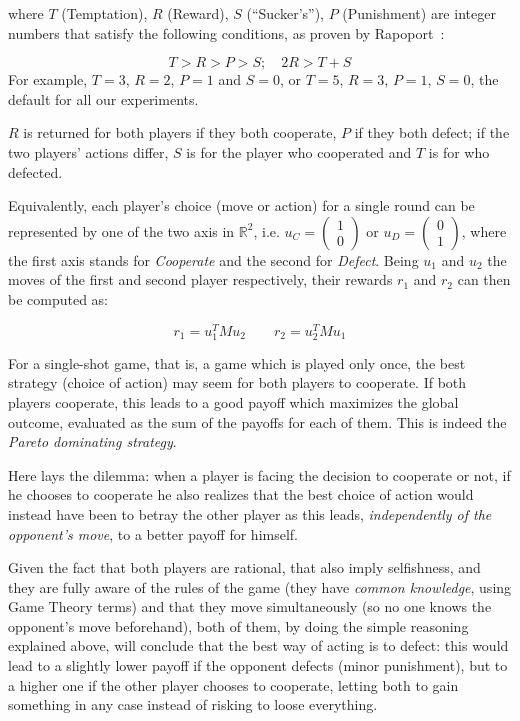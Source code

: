 \documentclass[journal,10pt,twoside]{IEEEtran}
\begin{document}
where $T$ (Temptation), $R$ (Reward), $S$ (``Sucker's''), $P$ (Punishment) are integer numbers that satisfy the following conditions, as proven by Rapoport~\cite{rapoport}:

$$
T>R>P>S; \quad 2R > T+S 
$$
For example, $T=3$, $R=2$, $P=1$ and $S=0$, or  $T=5$, $R=3$, $P=1$, $S=0$, the default for all our experiments.

$R$ is returned for both players if they both cooperate, $P$ if they both defect; if the two players' actions differ, $S$ is for the player who cooperated and $T$ is for who defected.

Equivalently, each player's choice (move or action) for a single round can be represented by one of the two axis in $\mathbb{R}^2$, i.e. $u_C=\begin{pmatrix} 1 \\ 0 \end{pmatrix}$ or $u_D=\begin{pmatrix} 0 \\ 1 \end{pmatrix}$, where the first axis stands for \textit{Cooperate} and the second for \textit{Defect}. Being $u_1$ and $u_2$ the moves of the first and second player respectively, their rewards $r_1$ and $r_2$ can then be computed as:

$$
r_1 = u_1^T M u_2
\quad
\quad
r_2 = u_2^T M u_1
$$

For a single-shot game, that is, a game which is played only once, the best strategy (choice of action) may seem for both players to cooperate. If both players cooperate, this leads to a good payoff which maximizes the global outcome, evaluated as the sum of the payoffs for each of them. This is indeed the \textit{Pareto dominating strategy}.

Here lays the dilemma: when a player is facing the decision to cooperate or not, if he chooses to cooperate he also realizes that the best choice of action would instead have been to betray the other player as this leads, \textit{independently of the opponent's move}, to a better payoff for himself.

Given the fact that both players are rational, that also imply selfishness, and they are fully aware of the rules of the game (they have \textit{common knowledge}, using Game Theory terms) and that they move simultaneously (so no one knows the opponent's move beforehand), both of them, by doing the simple reasoning explained above, will conclude that the best way of acting is to defect: this would lead to a slightly lower payoff if the opponent defects (minor punishment), but to a higher one if the other player chooses to cooperate, letting both to gain something in any case instead of risking to loose everything.
\end{document}
